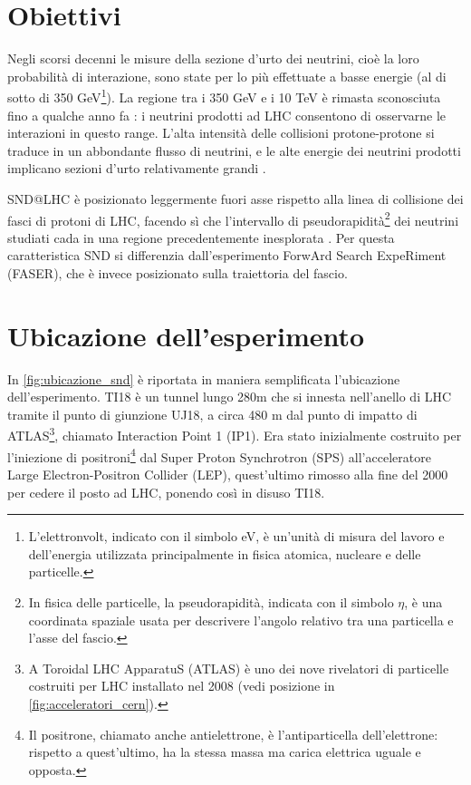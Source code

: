 %
%
\section{Obiettivi}
Negli scorsi decenni le misure della sezione d’urto dei neutrini, cioè la loro probabilità di interazione, sono state per lo più effettuate a basse energie (al di sotto di 350 GeV\footnote{L'elettronvolt, indicato con il simbolo eV, è un'unità di misura del lavoro e dell'energia utilizzata principalmente in fisica atomica, nucleare e delle particelle.}).
La regione tra i 350 GeV e i 10 TeV è rimasta sconosciuta fino a qualche anno fa \cite{Bustamante_Connolly}: i neutrini prodotti ad LHC consentono di osservarne le interazioni in questo range.
L’alta intensità delle collisioni protone-protone si traduce in un abbondante flusso di neutrini, e le alte energie dei neutrini prodotti implicano sezioni d’urto relativamente grandi \cite{SND_Observation}.

SND@LHC è posizionato leggermente fuori asse rispetto alla linea di collisione dei fasci di protoni di LHC, facendo sì che l'intervallo di pseudorapidità\footnote{In fisica delle particelle, la pseudorapidità, indicata con il simbolo $\eta$, è una coordinata spaziale usata per descrivere l'angolo relativo tra una particella e l'asse del fascio.} dei neutrini studiati cada in una regione precedentemente inesplorata \cite{LHCb_Charm}.
Per questa caratteristica SND si differenzia dall'esperimento ForwArd Search ExpeRiment (FASER), che è invece posizionato sulla traiettoria del fascio.


%
%
\section{Ubicazione dell'esperimento}
In \cref{fig:ubicazione_snd} è riportata in maniera semplificata l’ubicazione dell’esperimento.
TI18 è un tunnel lungo 280m che si innesta nell'anello di LHC tramite il punto di giunzione UJ18, a circa 480 m dal punto di impatto di ATLAS\footnote{A Toroidal LHC ApparatuS (ATLAS) è uno dei nove rivelatori di particelle costruiti per LHC installato nel 2008 (vedi posizione in \cref{fig:acceleratori_cern}).}, chiamato Interaction Point 1 (IP1).
Era stato inizialmente costruito per l’iniezione di positroni\footnote{Il positrone, chiamato anche antielettrone, è l'antiparticella dell'elettrone: rispetto a quest'ultimo, ha la stessa massa ma carica elettrica uguale e opposta.} dal Super Proton Synchrotron (SPS) all’acceleratore Large Electron-Positron Collider (LEP), quest'ultimo rimosso alla fine del 2000 per cedere il posto ad LHC, ponendo così in disuso TI18.

